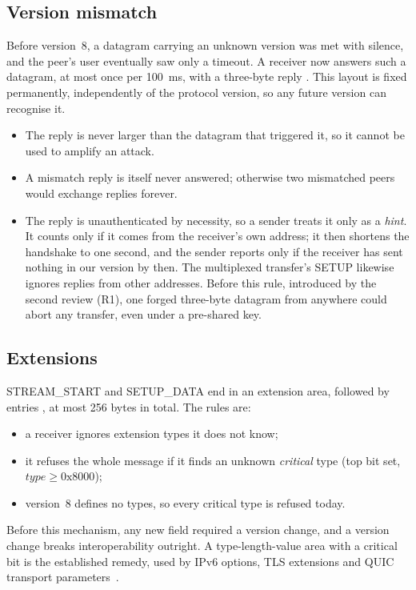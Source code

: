 \subsection{Version mismatch\vviii}

Before version~8, a datagram carrying an unknown version was met with silence, and the peer's user eventually
saw only a timeout. A receiver now answers such a datagram, at most once per 100~ms, with a three-byte reply
. This layout is fixed permanently, independently of the protocol
version, so any future version can recognise it.
\begin{itemize}
  \item The reply is never larger than the datagram that triggered it, so it cannot be used to amplify an attack.
  \item A mismatch reply is itself never answered; otherwise two mismatched peers would exchange replies forever.
  \item The reply is unauthenticated by necessity, so a sender treats it only as a \emph{hint}. It counts only
    if it comes from the receiver's own address; it then shortens the handshake to one second, and the sender
    reports  only if the receiver has sent nothing in our version by then. The
    multiplexed transfer's SETUP likewise ignores replies from other addresses. Before this rule, introduced by
    the second review (R1), one forged three-byte datagram from anywhere could abort any transfer, even under a
    pre-shared key.
\end{itemize}

\subsection{Extensions\vviii}

STREAM\_START and SETUP\_DATA end in an extension area,
 followed by entries \code{[type:2][len:2][value]}, at most 256 bytes in total. The
rules are:
\begin{itemize}
  \item a receiver ignores extension types it does not know;
  \item it refuses the whole message if it finds an unknown \emph{critical} type (top bit set,
    $\mathit{type}\ge\text{0x8000}$);
  \item version~8 defines no types, so every critical type is refused today.
\end{itemize}
Before this mechanism, any new field required a version change, and a version change breaks interoperability
outright. A type-length-value area with a critical bit is the established remedy, used by IPv6 options, TLS
extensions and QUIC transport parameters~\cite{rfc9000}.

